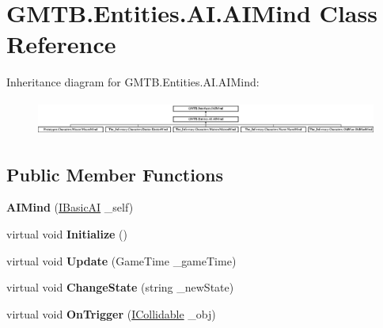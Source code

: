 \hypertarget{class_g_m_t_b_1_1_entities_1_1_a_i_1_1_a_i_mind}{}\section{G\+M\+T\+B.\+Entities.\+A\+I.\+A\+I\+Mind Class Reference}
\label{class_g_m_t_b_1_1_entities_1_1_a_i_1_1_a_i_mind}
Inheritance diagram for G\+M\+T\+B.\+Entities.\+A\+I.\+A\+I\+Mind\+:\begin{figure}[H]
\begin{center}
\leavevmode
\includegraphics[height=1.154639cm]{class_g_m_t_b_1_1_entities_1_1_a_i_1_1_a_i_mind}
\end{center}
\end{figure}
\subsection*{Public Member Functions}
\begin{DoxyCompactItemize}
\item 
\mbox{\label{class_g_m_t_b_1_1_entities_1_1_a_i_1_1_a_i_mind_ad3be011262e2fe877345d35631965976}} 
{\bfseries A\+I\+Mind} (\mbox{\hyperlink{interface_g_m_t_b_1_1_interfaces_1_1_i_basic_a_i}{I\+Basic\+AI}} \+\_\+self)
\item 
\mbox{\label{class_g_m_t_b_1_1_entities_1_1_a_i_1_1_a_i_mind_a47bd7fffaa4a9c33835dcc1cf8cf5111}} 
virtual void {\bfseries Initialize} ()
\item 
\mbox{\label{class_g_m_t_b_1_1_entities_1_1_a_i_1_1_a_i_mind_a009a9bc6203f77e88fbe9eb5ad072a22}} 
virtual void {\bfseries Update} (Game\+Time \+\_\+game\+Time)
\item 
\mbox{\label{class_g_m_t_b_1_1_entities_1_1_a_i_1_1_a_i_mind_a77deadd8869c2bb7e3302e227bb15661}} 
virtual void {\bfseries Change\+State} (string \+\_\+new\+State)
\item 
\mbox{\label{class_g_m_t_b_1_1_entities_1_1_a_i_1_1_a_i_mind_a929c618e761b481019033e6e37041500}} 
virtual void {\bfseries On\+Trigger} (\mbox{\hyperlink{interface_g_m_t_b_1_1_collision_system_1_1_i_collidable}{I\+Collidable}} \+\_\+obj)
\end{DoxyCompactItemize}

